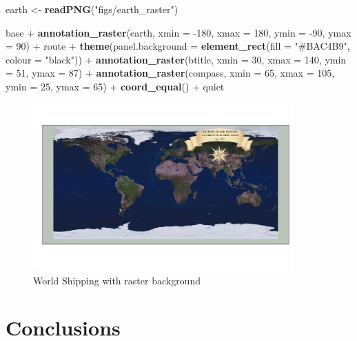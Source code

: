 \documentclass[]{article}
\newenvironment{Shaded}{}{}
\newcommand{\KeywordTok}[1]{\textcolor[rgb]{0.00,0.44,0.13}{\textbf{{#1}}}}
\newcommand{\DataTypeTok}[1]{\textcolor[rgb]{0.56,0.13,0.00}{{#1}}}
\newcommand{\DecValTok}[1]{\textcolor[rgb]{0.25,0.63,0.44}{{#1}}}
\newcommand{\StringTok}[1]{\textcolor[rgb]{0.25,0.44,0.63}{{#1}}}
\newcommand{\NormalTok}[1]{{#1}}
\let\Oldincludegraphics\includegraphics
\renewcommand{\includegraphics}[1]{\Oldincludegraphics[width=10cm]{#1}}
\begin{document}
\begin{Shaded}
\begin{Highlighting}[]
\NormalTok{earth <- }\KeywordTok{readPNG}\NormalTok{(}\StringTok{"figs/earth_raster"}\NormalTok{)}

\NormalTok{base + }\KeywordTok{annotation_raster}\NormalTok{(earth, }\DataTypeTok{xmin =} \NormalTok{-}\DecValTok{180}\NormalTok{, }\DataTypeTok{xmax =} \DecValTok{180}\NormalTok{, }\DataTypeTok{ymin =} \NormalTok{-}\DecValTok{90}\NormalTok{, }\DataTypeTok{ymax =} \DecValTok{90}\NormalTok{) + }
    \NormalTok{route + }\KeywordTok{theme}\NormalTok{(}\DataTypeTok{panel.background =} \KeywordTok{element_rect}\NormalTok{(}\DataTypeTok{fill =} \StringTok{"#BAC4B9"}\NormalTok{, }\DataTypeTok{colour =} \StringTok{"black"}\NormalTok{)) + }
    \KeywordTok{annotation_raster}\NormalTok{(btitle, }\DataTypeTok{xmin =} \DecValTok{30}\NormalTok{, }\DataTypeTok{xmax =} \DecValTok{140}\NormalTok{, }\DataTypeTok{ymin =} \DecValTok{51}\NormalTok{, }\DataTypeTok{ymax =} \DecValTok{87}\NormalTok{) + }
    \KeywordTok{annotation_raster}\NormalTok{(compass, }\DataTypeTok{xmin =} \DecValTok{65}\NormalTok{, }\DataTypeTok{xmax =} \DecValTok{105}\NormalTok{, }\DataTypeTok{ymin =} \DecValTok{25}\NormalTok{, }\DataTypeTok{ymax =} \DecValTok{65}\NormalTok{) + }
    \KeywordTok{coord_equal}\NormalTok{() + quiet}
\end{Highlighting}
\end{Shaded}
\begin{figure}[htbp]
\centering
\includegraphics{figs/World_Shipping_with_raster_background}
\caption{World Shipping with raster background}
\end{figure}

\section{Conclusions}
\end{document}
